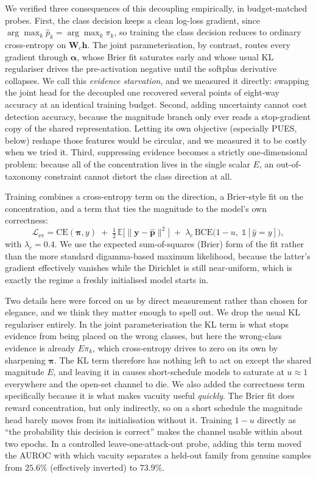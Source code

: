 \documentclass[conference]{IEEEtran}
\newcommand{\bs}[1]{\boldsymbol{#1}}
\begin{document}
We verified three consequences of this decoupling empirically, in budget-matched
probes. First, the class decision keeps a clean log-loss gradient, since
$\arg\max_{k}\hat{p}_{k}=\arg\max_{k}\pi_{k}$, so training the class decision
reduces to ordinary cross-entropy on $\bs{W}_{c}\bs{h}$. The joint parameterisation,
by contrast, routes every gradient through $\bs{\alpha}$, whose Brier fit saturates
early and whose usual KL regulariser drives the pre-activation negative until the
softplus derivative collapses. We call this \emph{evidence starvation}, and we
measured it directly: swapping the joint head for the decoupled one recovered
several points of eight-way accuracy at an identical training budget. Second, adding
uncertainty cannot cost detection accuracy, because the magnitude branch only ever
reads a stop-gradient copy of the shared representation. Letting its own objective
(especially PUES, below) reshape those features would be circular, and we measured
it to be costly when we tried it. Third, suppressing evidence becomes a strictly
one-dimensional problem: because all of the concentration lives in the single scalar
$E$, an out-of-taxonomy constraint cannot distort the class direction at all.

Training combines a cross-entropy term on the direction, a Brier-style fit on the
concentration, and a term that ties the magnitude to the model's own correctness:
\begin{equation}
\mathcal{L}_{\text{ev}} = \mathrm{CE}(\bs{\pi},y)
\;+\; \tfrac{1}{2}\,\mathbb{E}\bigl[\lVert \bs{y}-\hat{\bs{p}}\rVert^{2}\bigr]
\;+\; \lambda_{c}\,\mathrm{BCE}\bigl(1-u,\;\mathbb{1}[\hat{y}=y]\bigr),
\label{eq:evloss}
\end{equation}
with $\lambda_{c}=0.4$. We use the expected sum-of-squares (Brier) form of the fit
rather than the more standard digamma-based maximum likelihood, because the latter's
gradient effectively vanishes while the Dirichlet is still near-uniform, which is
exactly the regime a freshly initialised model starts in.

Two details here were forced on us by direct measurement rather than chosen for
elegance, and we think they matter enough to spell out. We drop the usual KL
regulariser entirely. In the joint parameterisation the KL term is what stops
evidence from being placed on the wrong classes, but here the wrong-class evidence
is already $E\pi_{k}$, which cross-entropy drives to zero on its own by sharpening
$\bs{\pi}$. The KL term therefore has nothing left to act on except the shared
magnitude $E$, and leaving it in causes short-schedule models to saturate at
$u\approx1$ everywhere and the open-set channel to die. We also added the
correctness term specifically because it is what makes vacuity useful
\emph{quickly}. The Brier fit does reward concentration, but only indirectly, so on
a short schedule the magnitude head barely moves from its initialisation without it.
Training $1-u$ directly as ``the probability this decision is correct'' makes the
channel usable within about two epochs. In a controlled leave-one-attack-out probe,
adding this term moved the AUROC with which vacuity separates a held-out family from
genuine samples from $25.6\%$ (effectively inverted) to $73.9\%$.
\end{document}

